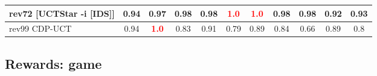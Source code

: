 \documentclass{article}
\begin{document}
\begin{tabular}{|l|r@{$\pm$}rr@{$\pm$}rr@{$\pm$}rr@{$\pm$}rr@{$\pm$}rr@{$\pm$}rr@{$\pm$}rr@{$\pm$}rr@{$\pm$}rr@{$\pm$}r|}
rev72 [UCTStar -i [IDS]]
& \multicolumn{2}{c}{0.94}
& \multicolumn{2}{c}{0.97}
& \multicolumn{2}{c}{0.98}
& \multicolumn{2}{c}{0.98}
& \multicolumn{2}{c}{\textbf{\textcolor{red}{1.0}}}
& \multicolumn{2}{c}{\textbf{\textcolor{red}{1.0}}}
& \multicolumn{2}{c}{0.98}
& \multicolumn{2}{c}{0.98}
& \multicolumn{2}{c}{0.92}
& \multicolumn{2}{c|}{0.93}
\\
\hline
rev99 CDP-UCT
& \multicolumn{2}{c}{0.94}
& \multicolumn{2}{c}{\textbf{\textcolor{red}{1.0}}}
& \multicolumn{2}{c}{0.83}
& \multicolumn{2}{c}{0.91}
& \multicolumn{2}{c}{0.79}
& \multicolumn{2}{c}{0.89}
& \multicolumn{2}{c}{0.84}
& \multicolumn{2}{c}{0.66}
& \multicolumn{2}{c}{0.89}
& \multicolumn{2}{c|}{0.8}
\\
\hline
\end{tabular}%

\bigskip

\subsection*{Rewards: game}
\end{document}
